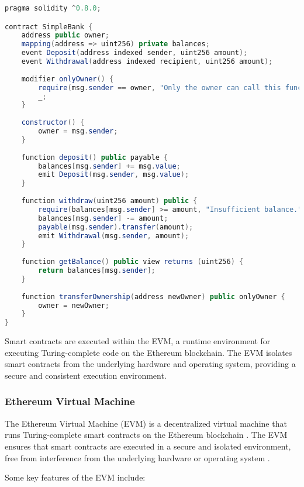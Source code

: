\begin{lstlisting}[language=Java, caption={Smart Contract Template}, label={lst:sc_template}]
pragma solidity ^0.8.0;

contract SimpleBank {
    address public owner;
    mapping(address => uint256) private balances;
    event Deposit(address indexed sender, uint256 amount);
    event Withdrawal(address indexed recipient, uint256 amount);
    
    modifier onlyOwner() {
        require(msg.sender == owner, "Only the owner can call this function.");
        _;
    }
    
    constructor() {
        owner = msg.sender;
    }
    
    function deposit() public payable {
        balances[msg.sender] += msg.value;
        emit Deposit(msg.sender, msg.value);
    }
    
    function withdraw(uint256 amount) public {
        require(balances[msg.sender] >= amount, "Insufficient balance.");
        balances[msg.sender] -= amount;
        payable(msg.sender).transfer(amount);
        emit Withdrawal(msg.sender, amount);
    }
    
    function getBalance() public view returns (uint256) {
        return balances[msg.sender];
    }
    
    function transferOwnership(address newOwner) public onlyOwner {
        owner = newOwner;
    }
}
\end{lstlisting}

Smart contracts are executed within the \ac{EVM}, a runtime environment for executing Turing-complete code on the Ethereum blockchain. The \ac{EVM} isolates smart contracts from the underlying hardware and operating system, providing a secure and consistent execution environment.

\subsubsection{Ethereum Virtual Machine}
The Ethereum Virtual Machine (EVM) is a decentralized virtual machine that runs Turing-complete smart contracts on the Ethereum blockchain \cite{wood2014ethereum}. The EVM ensures that smart contracts are executed in a secure and isolated environment, free from interference from the underlying hardware or operating system \cite{buterin2013ethereum}.

Some key features of the EVM include:

